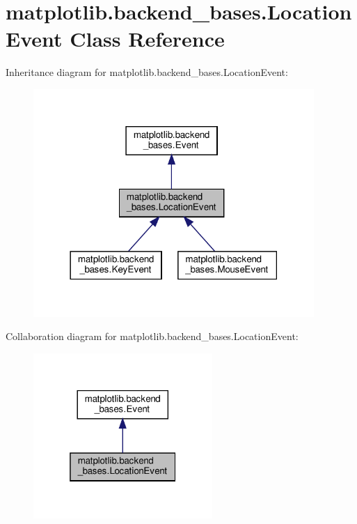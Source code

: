 \hypertarget{classmatplotlib_1_1backend__bases_1_1LocationEvent}{}\section{matplotlib.\+backend\+\_\+bases.\+Location\+Event Class Reference}
\label{classmatplotlib_1_1backend__bases_1_1LocationEvent}


Inheritance diagram for matplotlib.\+backend\+\_\+bases.\+Location\+Event\+:
\nopagebreak
\begin{figure}[H]
\begin{center}
\leavevmode
\includegraphics[width=302pt]{classmatplotlib_1_1backend__bases_1_1LocationEvent__inherit__graph}
\end{center}
\end{figure}


Collaboration diagram for matplotlib.\+backend\+\_\+bases.\+Location\+Event\+:
\nopagebreak
\begin{figure}[H]
\begin{center}
\leavevmode
\includegraphics[width=193pt]{classmatplotlib_1_1backend__bases_1_1LocationEvent__coll__graph}
\end{center}
\end{figure}
